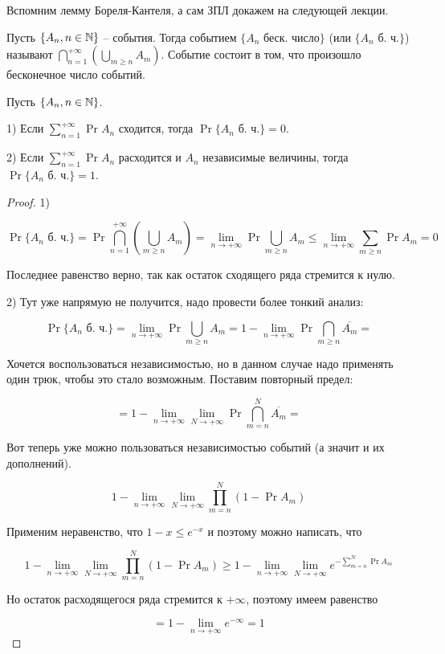 Вспомним лемму Бореля-Кантеля, а сам ЗПЛ докажем на следующей лекции.

\begin{definition}
  Пусть $\{A_n, n \in \mathbb{N}\}$ -- события. Тогда событием $\{A_n \text{ беск. число}\}$
  (или $\{A_n \text{ б. ч.}\}$)
  называют $\bigcap\limits_{n = 1}^{+\infty}\left(\bigcup\limits_{m \geq n} A_m\right)$. Событие
  состоит в том, что произошло бесконечное число событий.
\end{definition}

\begin{theorem}
  Пусть $\{A_n, n \in \mathbb{N}\}$. 

  1) Если $\sum\limits_{n = 1}^{+\infty} \Pr{A_n}$ сходится,
  тогда $\Pr{\{A_n \text{ б. ч.}\}} = 0$.

  2) Если $\sum\limits_{n = 1}^{+\infty} \Pr{A_n}$ расходится и $A_n$ независимые
  величины,
  тогда $\Pr{\{A_n \text{ б. ч.}\}} = 1$.
\end{theorem}

\begin{proof}
  1)

  \[
    \Pr{\{A_n \text{ б. ч.}\}} = \Pr{\bigcap\limits_{n = 1}^{+\infty}\left(\bigcup\limits_{m \geq n} A_m\right)} =
    \lim\limits_{n \to +\infty} \Pr{\bigcup\limits_{m \geq n} A_m} \leq
    \lim\limits_{n \to +\infty} \sum\limits_{m \geq n} \Pr{A_m} = 0
  \]

  Последнее равенство верно, так как остаток сходящего ряда стремится к нулю.

  2) Тут уже напрямую не получится, надо провести более тонкий анализ:

  \[
     \Pr{\{A_n \text{ б. ч.}\}} =  \lim\limits_{n \to +\infty} 
     \Pr{\bigcup\limits_{m \geq n} A_m} = 1 - \lim\limits_{n \to +\infty}
     \Pr{\bigcap\limits_{m \geq n} \overline{A_m}} = 
  \]

  Хочется воспользоваться независимостью, но в данном случае надо применять один
  трюк, чтобы это стало возможным. Поставим повторный предел:

  \[
    =  1 - \lim\limits_{n \to +\infty}\lim\limits_{N \to +\infty} \Pr{\bigcap\limits_{m = n}^{N} \overline{A_m}} = 
  \]

  Вот теперь уже можно пользоваться независимостью событий (а значит и их
  дополнений).

  \[
    1 - \lim\limits_{n \to +\infty}\lim\limits_{N \to +\infty} \prod_{m = n}^{N}(1 -
    \Pr{A_m}) 
  \]

  Применим неравенство, что $1 - x \leqslant e^{-x}$ и поэтому можно написать, что

  \[
    1 - \lim\limits_{n \to +\infty}\lim\limits_{N \to +\infty} \prod_{m = n}^{N}(1 -
    \Pr{A_m}) \geq 1 - \lim\limits_{n \to +\infty}\lim\limits_{N \to +\infty}
    e^{-\sum\limits_{m = n}^{N} \Pr{A_m}}
  \]

  Но остаток расходящегося ряда стремится к $+\infty$, поэтому имеем равенство

  \[
    = 1 - \lim\limits_{n \to +\infty}e^{-\infty} = 1
  \]
\end{proof}
